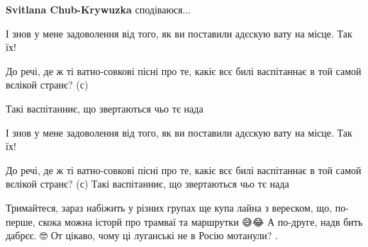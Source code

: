 \begin{itemize}
\begin{itemize}
\textbf{Svitlana Chub-Krywuzka} сподіваюся...
\end{itemize}

 
І знов у мене задоволення від того, як ви поставили адєскую вату на місце. Так їх!

 

До речі, де ж ті ватно-совкові пісні про те, какіє всє билі васпітаннає в той
самой вєлікой странє? (с)

Такі васпітанниє, що звертаються чьо тє нада

\begin{itemize}
 
І знов у мене задоволення від того, як ви поставили адєскую вату на місце. Так їх!

 
До речі, де ж ті ватно-совкові пісні про те, какіє всє билі васпітаннає в той самой вєлікой странє? (с)
Такі васпітанниє, що звертаються чьо тє нада
\end{itemize}

 

Тримайтеся, зараз набіжить у різних групах ще купа лайна з вереском, що,
по-перше, скока можна історй про трамваї та маршрутки 😅😂 А по-друге, надв
бить дабрєє. 🤓 От цікаво, чому ці луганські не в Росію мотанули? .


\end{itemize}
